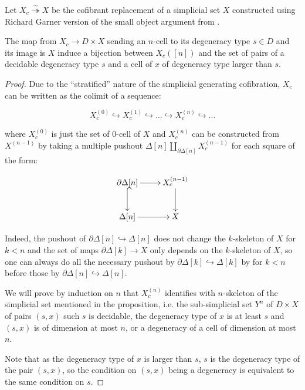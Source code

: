 \documentclass[reqno,10pt,a4paper,oneside,draft]{amsart}
\begin{document}
Let $X_c \overset{\sim}{\twoheadrightarrow} X $ be the cofibrant replacement of a simplicial set $X$ constructed using Richard Garner version of the small object argument from \cite{garner:small-object-argument}.

\begin{proposition}
The map from $X_c \rightarrow D \times X$ sending an $n$-cell to its degeneracy type $s \in D$ and its image is $X$ induce a bijection between $X_c([n])$ and the set of pairs of a decidable degeneracy type $s$ and a cell of $x$ of degeneracy type larger than $s$.
\end{proposition}

\begin{proof}

Due to the ``stratified'' nature of the simplicial generating cofibration, $X_c$ can be written as the colimit of a sequence:


 \[ X^{(0)}_c \hookrightarrow X^{(1)}_c \hookrightarrow \dots \hookrightarrow X^{(n)}_c \hookrightarrow \dots \]

where $X^{(0)}_c$ is just the set of $0$-cell of $X$ and $X^{(n)}_c$ can be constructed from $X^{(n-1)}$ by taking a multiple pushout $\Delta[n] \coprod_{\partial \Delta[n]} X^{(n-1)}_c$ for each square of the form:

\[ \xymatrix{\partial \Delta[n]  \ar[r] \ar@{^{(}->}[d] & X^{(n-1)}_c \ar[d] \\ \Delta[n]  \ar[r] & X} \]

Indeed, the pushout of $\partial \Delta[n] \hookrightarrow \Delta[n]$ does not change the $k$-skeleton of $X$ for $k <n$ and the set of maps $\partial \Delta[k] \rightarrow X$ only depends on the $k$-skeleton of $X$, so one can always do all the necessary pushout by $\partial \Delta[k] \hookrightarrow \Delta[k]$ by for $k<n$ before those by $\partial \Delta[n] \hookrightarrow \Delta[n]$.


We will prove by induction on $n$ that $X^{(n)}_c$ identifies with $n$-skeleton of the simplicial set mentioned in the proposition, i.e. the sub-simplicial set $Y^n$ of $D \times X$ of pairs $(s,x)$ such $s$ is decidable,  the degeneracy type of $x$ is at least $s$ and $(s,x)$ is of dimension at most $n$, or a degeneracy of a cell of dimension at most $n$.

Note that as the degeneracy type of $x$ is larger than $s$, $s$ is the degeneracy type of the pair $(s,x)$, so the condition on $(s,x)$ being a degeneracy is equivalent to the same condition on $s$.


\end{proof}
\end{document}
